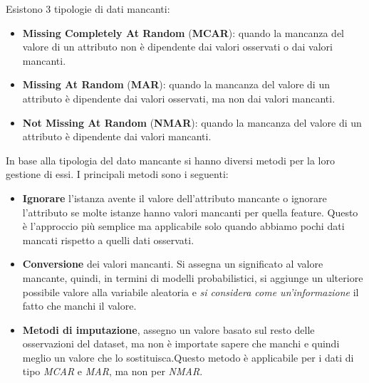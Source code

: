 Esistono 3 tipologie di dati mancanti:
\begin{itemize}
    \item \textbf{Missing Completely At Random} (\textbf{MCAR}): quando la
          mancanza del valore di un attributo non è dipendente dai valori
          osservati o dai valori mancanti.
    \item \textbf{Missing At Random} (\textbf{MAR}): quando la mancanza del
          valore di un attributo è dipendente dai valori osservati, ma non dai
          valori mancanti.
    \item \textbf{Not Missing At Random} (\textbf{NMAR}): quando la mancanza del
          valore di un attributo è dipendente dai valori mancanti.
\end{itemize}
In base alla tipologia del dato mancante si hanno diversi metodi per la loro
gestione di essi. I principali metodi sono i seguenti:
\begin{itemize}
    \item \textbf{Ignorare} l'istanza avente il valore dell'attributo mancante o
          ignorare l'attributo se molte istanze hanno valori mancanti per quella
          feature. Questo è l'approccio più semplice ma applicabile solo quando
          abbiamo pochi dati mancati rispetto a quelli dati osservati.
    \item \textbf{Conversione} dei valori mancanti. Si assegna un significato al
          valore mancante, quindi, in termini di modelli probabilistici, si
          aggiunge un ulteriore possibile valore alla variabile aleatoria e
          \textit{si considera come un'informazione} il fatto che manchi il valore.
    \item \textbf{Metodi di imputazione}, assegno un valore basato sul resto delle
          osservazioni del dataset, ma non è importate sapere che manchi e quindi
          meglio un valore che lo sostituisca.Questo metodo è applicabile per i
          dati di tipo \textit{MCAR} e \textit{MAR}, ma non per \textit{NMAR}.
\end{itemize}
